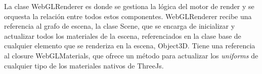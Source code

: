   La clase WebGLRenderer es donde se gestiona la l\'ogica del motor de render y se orquesta la relaci\'on entre todos estos componentes.
  WebGLRenderer recibe una referencia al grafo de escena, la clase Scene, que se encarga de inicializar y actualizar todos
  los materiales de la escena, referenciados en la clase base de cualquier elemento que se renderiza en la escena, Object3D.
  Tiene una referencia al closure WebGLMaterials, que ofrece un m\'etodo para actualizar los \textit{uniforms} de cualquier tipo
  de los materiales nativos de ThreeJs.

